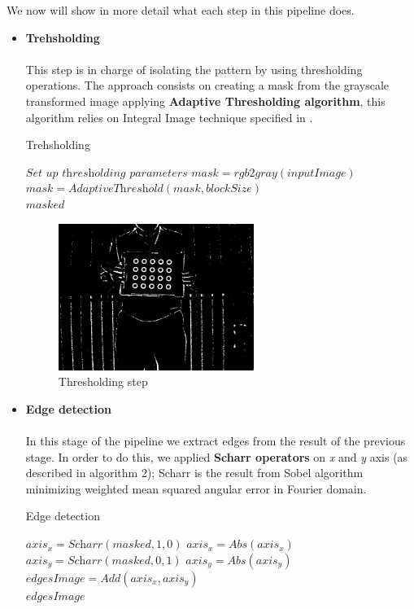 \documentclass[journal]{IEEEtran}
\begin{document}
We now will show in more detail what each step in this pipeline does.
\\
\begin{itemize}
    \item \textbf{Trehsholding}
        \\
        \\
        This step is in charge of isolating the pattern by using thresholding operations. The approach consists on creating a mask from the grayscale transformed image applying \textbf{Adaptive Thresholding algorithm}, this algorithm relies on Integral Image technique specified in \cite{IntegralImageThresholding}.
        \begin{algorithm}
        \caption{Trehsholding}
        \label{alg:mask2}
        \begin{algorithmic}[1]
        \State $\textit{Set up thresholding parameters}$
        \State $mask   = \textit{rgb2gray}( inputImage )$
        \State $mask   = \textit{AdaptiveThreshold}(mask, blockSize)$\\
        \Return $masked$
        \end{algorithmic}
        \end{algorithm}
        \begin{figure}[H]
        \centering
        \includegraphics[width=2.5in]{_img/report_4/img_pipeline_detection_mask.png}
        \caption{Thresholding step}
        \end{figure}

    \item \textbf{Edge detection}
        \\
        \\
        In this stage of the pipeline we extract edges from the result of the previous stage. In order to do this, we applied \textbf{Scharr operators} on \textit{x} and \textit{y} axis (as described in algorithm 2); Scharr is the result from Sobel algorithm minimizing weighted mean squared angular error in Fourier domain.
        \begin{algorithm}
        \caption{Edge detection}
        \begin{algorithmic}[1]
        \State $axis_x   = \textit{Scharr}(masked, 1, 0)$
        \State $axis_x   = \textit{Abs}(axis_x)$
        \State $axis_y   = \textit{Scharr}(masked, 0, 1)$
        \State $axis_y   = \textit{Abs}(axis_y)$
        \State $edgesImage   = \textit{Add}(axis_x, axis_y)$ \\
        \Return $edgesImage$
        \end{algorithmic}
        \end{algorithm}


\end{itemize}
\end{document}
